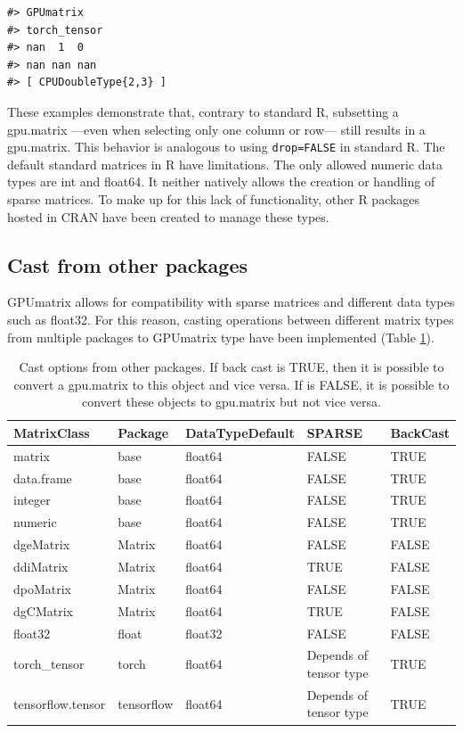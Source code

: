 \begin{verbatim}
#> GPUmatrix
#> torch_tensor
#> nan  1  0
#> nan nan nan
#> [ CPUDoubleType{2,3} ]
\end{verbatim}

These examples demonstrate that, contrary to standard R, subsetting a gpu.matrix ---even when selecting only one column or row--- still results in a gpu.matrix. This behavior is analogous to using \texttt{drop=FALSE} in standard R. The default standard matrices in R have limitations. The only allowed numeric data types are int and float64. It neither natively allows the creation or handling of sparse matrices. To make up for this lack of functionality, other R packages hosted in CRAN have been created to manage these types.

\hypertarget{cast-from-other-packages}{%
\subsection{Cast from other packages}\label{cast-from-other-packages}}

GPUmatrix allows for compatibility with sparse matrices and different data types such as float32. For this reason, casting operations between different matrix types from multiple packages to GPUmatrix type have been implemented (Table \ref{tab:cast-packages-latex}).

\begin{table}

\caption{\label{tab:cast-packages-latex}Cast options from other packages. If back cast is TRUE, then it is possible to convert a gpu.matrix to this object and vice versa. If is FALSE, it is possible to convert these objects to gpu.matrix but not vice versa.}
\centering
\begin{tabular}[t]{lllll}
\toprule
MatrixClass & Package & DataTypeDefault & SPARSE & BackCast\\
\midrule
matrix & base & float64 & FALSE & TRUE\\
data.frame & base & float64 & FALSE & TRUE\\
integer & base & float64 & FALSE & TRUE\\
numeric & base & float64 & FALSE & TRUE\\
dgeMatrix & Matrix & float64 & FALSE & FALSE\\
\addlinespace
ddiMatrix & Matrix & float64 & TRUE & FALSE\\
dpoMatrix & Matrix & float64 & FALSE & FALSE\\
dgCMatrix & Matrix & float64 & TRUE & FALSE\\
float32 & float & float32 & FALSE & FALSE\\
torch\_tensor & torch & float64 & Depends of tensor type & TRUE\\
\addlinespace
tensorflow.tensor & tensorflow & float64 & Depends of tensor type & TRUE\\
\bottomrule
\end{tabular}
\end{table}

